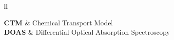 \begin{abbreviations}{ll} %

\textbf{CTM} & Chemical Transport Model \\
\textbf{DOAS} & Differential Optical Absorption Spectroscopy \\

\end{abbreviations}
